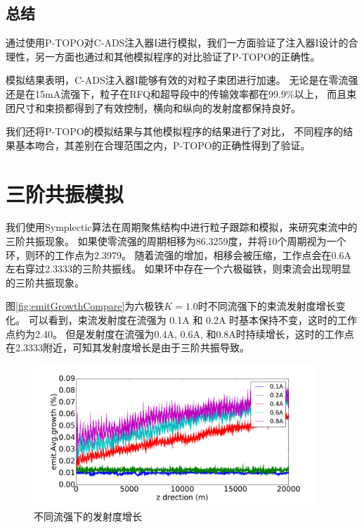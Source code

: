 \subsection{总结}  \label{section:ADS_simulation_conclusion}

通过使用P-TOPO对C-ADS注入器I进行模拟，我们一方面验证了注入器I设计的合理性，另一方面也通过和其他模拟程序的对比验证了P-TOPO的正确性。

模拟结果表明，C-ADS注入器I能够有效的对粒子束团进行加速。
无论是在零流强还是在15mA流强下，粒子在RFQ和超导段中的传输效率都在99.9\%以上，
而且束团尺寸和束损都得到了有效控制，横向和纵向的发射度都保持良好。

我们还将P-TOPO的模拟结果与其他模拟程序的结果进行了对比，
不同程序的结果基本吻合，其差别在合理范围之内，P-TOPO的正确性得到了验证。

\section{三阶共振模拟}            \label{section:3rd_order_simulation}
我们使用Symplectic算法在周期聚焦结构中进行粒子跟踪和模拟，来研究束流中的三阶共振现象。
如果使零流强的周期相移为86.3259度，并将10个周期视为一个环，则环的工作点为2.3979。
随着流强的增加，相移会被压缩，工作点会在0.6A左右穿过2.3333的三阶共振线。
如果环中存在一个六极磁铁，则束流会出现明显的三阶共振现象。

图\eqref{fig:emitGrowthCompare}为六极铁$K=1.0$时不同流强下的束流发射度增长变化。
可以看到，束流发射度在流强为 0.1A 和 0.2A 时基本保持不变，这时的工作点约为2.40。
但是发射度在流强为0.4A, 0.6A, 和0.8A时持续增长，这时的工作点在2.3333附近，可知其发射度增长是由于三阶共振导致。

\begin{figure}[!htb]
    \centering
    \includegraphics[width=0.95\textwidth]{Img/SymplecticEmitGrowthCompare.pdf}
    \caption{不同流强下的发射度增长}
    \label{fig:emitGrowthCompare}
\end{figure}

